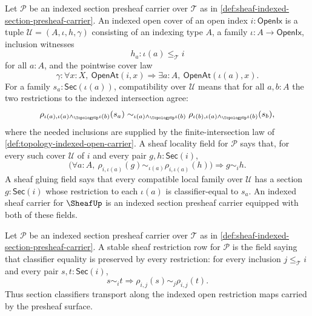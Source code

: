 \begin{definition}
\label{def:sheaf-indexed-cover-compatibility-locality}
Let $\mathcal{P}$ be an indexed section presheaf carrier over $\mathcal{T}$ as in \autoref{def:sheaf-indexed-section-presheaf-carrier}. An indexed open cover of an open index $i:\mathsf{OpenIx}$ is a tuple $\mathcal{U}=(A,\iota,h,\gamma)$ consisting of an indexing type $A$, a family $\iota:A\to\mathsf{OpenIx}$, inclusion witnesses
$$
h_a:\iota(a)\le_{\mathcal{T}}i
$$
for all $a:A$, and the pointwise cover law
$$
\gamma:
\forall x:X,\ \mathsf{OpenAt}(i,x)\Longrightarrow
\exists a:A,\ \mathsf{OpenAt}(\iota(a),x).
$$
For a family $s_a:\mathsf{Sec}(\iota(a))$, compatibility over $\mathcal{U}$ means that for all $a,b:A$ the two restrictions to the indexed intersection agree:
$$
\rho_{\iota(a),\iota(a)\wedge_{\TopologyUp}\iota(b)}(s_a)
\sim_{\iota(a)\wedge_{\TopologyUp}\iota(b)}
\rho_{\iota(b),\iota(a)\wedge_{\TopologyUp}\iota(b)}(s_b),
$$
where the needed inclusions are supplied by the finite-intersection law of \autoref{def:topology-indexed-open-carrier}. A sheaf locality field for $\mathcal{P}$ says that, for every such cover $\mathcal{U}$ of $i$ and every pair $g,h:\mathsf{Sec}(i)$,
$$
\bigl(\forall a:A,\ \rho_{i,\iota(a)}(g)\sim_{\iota(a)}\rho_{i,\iota(a)}(h)\bigr)
\Longrightarrow
g\sim_i h.
$$
A sheaf gluing field says that every compatible local family over $\mathcal{U}$ has a section $g:\mathsf{Sec}(i)$ whose restriction to each $\iota(a)$ is classifier-equal to $s_a$. An indexed sheaf carrier for $\SheafUp$ is an indexed section presheaf carrier equipped with both of these fields.
\end{definition}

\begin{definition}
\label{def:sheaf-stable-restriction-row}
Let $\mathcal{P}$ be an indexed section presheaf carrier over $\mathcal{T}$ as in \autoref{def:sheaf-indexed-section-presheaf-carrier}. A stable sheaf restriction row for $\mathcal{P}$ is the field saying that classifier equality is preserved by every restriction: for every inclusion $j\le_{\mathcal{T}} i$ and every pair $s,t:\mathsf{Sec}(i)$,
$$
s\sim_i t
\Longrightarrow
\rho_{i,j}(s)\sim_j\rho_{i,j}(t).
$$
Thus section classifiers transport along the indexed open restriction maps carried by the presheaf surface.
\end{definition}

